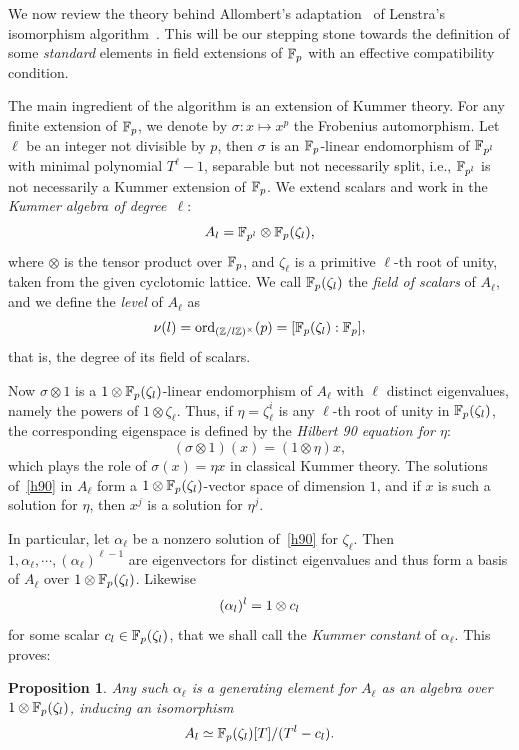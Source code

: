 \documentclass{sig-alternate}
\newtheorem{proposition}[theorem]{Proposition}
\begin{document}
We now review the theory behind Allombert's
adaptation~\cite{Allombert02} of Lenstra's isomorphism
algorithm~\cite{LenstraJr91}. %
This will be our stepping stone towards the definition of some
\emph{standard} elements in field extensions of $\mathbb{F}_p$ with an
effective compatibility condition.

The main ingredient of the algorithm is an extension
of Kummer theory.
For any finite extension of $\mathbb{F}_{p}$, we denote by $ \sigma:x\mapsto x^p $
the Frobenius automorphism.
Let $\ell$ be an integer not divisible by $p$,
then $\sigma$ is an $\mathbb{F}_{p}$-linear endomorphism of $\mathbb{F}_{p^l}$
with minimal polynomial $T^\ell-1$, separable but not necessarily split,
i.e., $\mathbb{F}_{p^l}$ is not necessarily a Kummer extension of $\mathbb{F}_{p}$.
We extend scalars and work in the
\emph{Kummer algebra of degree~$\ell$}:
\[
  A_l = \mathbb{F}_{p^l}\otimes\mathbb{F}_{p}(\zeta_l),
\]
where $\otimes$ is the tensor product over $\mathbb{F}_{p}$, and $\zeta_\ell$ is a primitive
$\ell$-th root of unity, taken from the given cyclotomic lattice. We
call $\mathbb{F}_{p}(\zeta_l)$ the \emph{field of scalars} of $A_\ell$, and
we define the \emph{level} of $A_\ell$ as
\[
  \nu(l) = \mathrm{ord}_{(\mathbb{Z}/l\mathbb{Z})^\times}(p) = [\mathbb{F}_{p}(\zeta_l):\mathbb{F}_{p}],
\]
that is, the degree of its field of scalars.

Now $\sigma\otimes1$ is a $1\otimes\mathbb{F}_{p}(\zeta_l)$-linear endomorphism of $A_\ell$
with $\ell$ distinct eigenvalues, namely the powers of $1\otimes\zeta_\ell$.
Thus, if $\eta=\zeta_\ell^i$ is any $\ell$-th root of unity in $\mathbb{F}_{p}(\zeta_l)$,
the corresponding eigenspace is defined by the \emph{Hilbert 90 equation for $\eta$}:
\begin{equation}
  \tag{H90}
 (\sigma\otimes1)(x) = (1\otimes\eta)x,
  \label{h90}
\end{equation}
which plays the role of $\sigma(x)=\eta x$ in classical Kummer theory.
The solutions of~\eqref{h90} in $A_\ell$ form a
$1\otimes\mathbb{F}_{p}(\zeta_{l})$-vector space of dimension $1$,
and if $x$ is such a solution for $\eta$, then $x^j$ is a solution for $\eta^j$.

In particular, let $\alpha_\ell$ be a nonzero solution of~\eqref{h90} for $\zeta_\ell$.
Then $1,\alpha_\ell,\cdots,(\alpha_\ell)^{\ell-1}$ are eigenvectors for distinct eigenvalues and thus
form a basis of $A_\ell$ over $1\otimes\mathbb{F}_{p}(\zeta_{l})$.
Likewise
\[ (\alpha_l)^l = 1\otimes c_l \]
for some scalar $c_l\in\mathbb{F}_{p}(\zeta_l)$,
that we shall call the \emph{Kummer constant} of $\alpha_\ell$.
This proves:
\begin{proposition}
\label{alphagen}
Any such $\alpha_\ell$ is a generating element for $A_\ell$ as an algebra over $1\otimes\mathbb{F}_{p}(\zeta_{l})$,
inducing an isomorphism
\[ A_l\simeq \mathbb{F}_{p}(\zeta_{l})[T]/(T^l-c_l). \]
\end{proposition}
\end{document}
